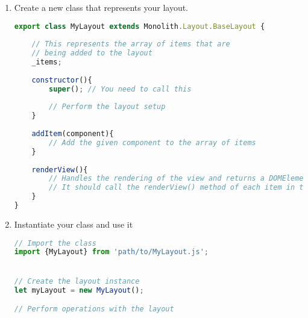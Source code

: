 \begin{enumerate}

	\item Create a new class that represents your layout.
\begin{lstlisting}[language=JavaScript]
export class MyLayout extends Monolith.Layout.BaseLayout {
    
    // This represents the array of items that are 
    // being added to the layout
    _items;
    
    constructor(){
        super(); // You need to call this
        
        // Perform the layout setup
    }
    
    addItem(component){
        // Add the given component to the array of items
    }
    
    renderView(){
        // Handles the rendering of the view and returns a DOMElement object
        // It should call the renderView() method of each item in the list
    }
}
\end{lstlisting}

	\item Instantiate your class and use it
\begin{lstlisting}[language=JavaScript]
// Import the class
import {MyLayout} from 'path/to/MyLayout.js';


// Create the layout instance
let myLayout = new MyLayout();

// Perform operations with the layout
\end{lstlisting}

\end{enumerate}


\newpage